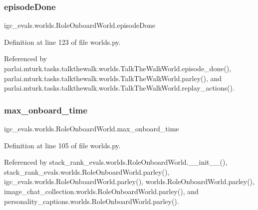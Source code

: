 \subsubsection{\texorpdfstring{episode\+Done}{episodeDone}}
{\footnotesize\ttfamily igc\+\_\+evals.\+worlds.\+Role\+Onboard\+World.\+episode\+Done}



Definition at line 123 of file worlds.\+py.



Referenced by parlai.\+mturk.\+tasks.\+talkthewalk.\+worlds.\+Talk\+The\+Walk\+World.\+episode\+\_\+done(), parlai.\+mturk.\+tasks.\+talkthewalk.\+worlds.\+Talk\+The\+Walk\+World.\+parley(), and parlai.\+mturk.\+tasks.\+talkthewalk.\+worlds.\+Talk\+The\+Walk\+World.\+replay\+\_\+actions().

\mbox{\label{classigc__evals_1_1worlds_1_1RoleOnboardWorld_ac1d2cbbaa66cf111ba39cbd112448b99}} 
\subsubsection{\texorpdfstring{max\+\_\+onboard\+\_\+time}{max\_onboard\_time}}
{\footnotesize\ttfamily igc\+\_\+evals.\+worlds.\+Role\+Onboard\+World.\+max\+\_\+onboard\+\_\+time}



Definition at line 105 of file worlds.\+py.



Referenced by stack\+\_\+rank\+\_\+evals.\+worlds.\+Role\+Onboard\+World.\+\_\+\+\_\+init\+\_\+\+\_\+(), stack\+\_\+rank\+\_\+evals.\+worlds.\+Role\+Onboard\+World.\+parley(), igc\+\_\+evals.\+worlds.\+Role\+Onboard\+World.\+parley(), worlds.\+Role\+Onboard\+World.\+parley(), image\+\_\+chat\+\_\+collection.\+worlds.\+Role\+Onboard\+World.\+parley(), and personality\+\_\+captions.\+worlds.\+Role\+Onboard\+World.\+parley().

\mbox{\label{classigc__evals_1_1worlds_1_1RoleOnboardWorld_ae6b8b37395e2430f1d533b6fc4cee64e}} 
